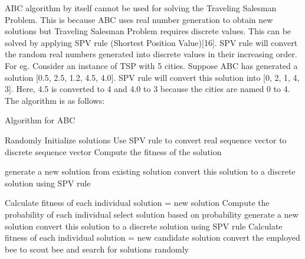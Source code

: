 \documentclass[conference]{IEEEtran}
\begin{document}
ABC algorithm by itself cannot be used for solving the Traveling Salesman Problem. This is because ABC uses real number generation to obtain new solutions but Traveling Salesman Problem requires discrete values. This can be solved by applying SPV rule (Shortest Position Value)[16]. SPV rule will convert the random real numbers generated into discrete values in their increasing order. For eg. Consider an instance of TSP with 5 cities. Suppose ABC has generated  a solution [0.5, 2.5, 1.2, 4.5, 4.0]. SPV rule will convert this solution into [0, 2, 1, 4, 3]. Here, 4.5 is converted to 4 and 4.0 to 3 because the cities are named 0 to 4. The algorithm is as follows:


\begin{algorithm}[H]
\caption{Algorithm for ABC}
\begin{algorithmic}[1]
\STATE Randomly Initialize solutions
\STATE Use SPV rule to convert real sequence vector to discrete sequence vector
\ENDFOR 
\STATE Compute the fitness of the solution
\ENDFOR 

\REPEAT
{}

\STATE generate a new solution from existing solution
\STATE convert this solution to a discrete solution using SPV rule
\ENDFOR 


\STATE Calculate fitness of each individual
\STATE solution = new solution
\ENDIF
\ENDFOR
\STATE Compute the probability of each individual
\STATE select solution based on probability
\STATE generate a new solution
\STATE convert this solution to a discrete solution using SPV rule
\ENDFOR
\STATE Calculate fitness of each individual
\STATE solution = new candidate solution
\ENDIF
\ENDFOR
{}
\STATE convert the employed bee to scout bee and search for solutions randomly
\ENDIF

\end{algorithmic}
\end{algorithm}
\end{document}

